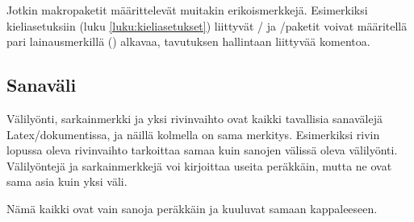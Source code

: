 
Jotkin makropaketit määrittelevät muitakin erikoismerkkejä. Esimerkiksi
kieli\-asetuksiin (luku \ref{luku:kieliasetukset}) liittyvät
\-/{} ja \-/paketit voivat
määritellä pari lainausmerkillä (\koodi{\textquotedbl}) alkavaa,
tavutuksen hallintaan liittyvää komentoa.

\subsection{Sanaväli}
\label{luku:sanavali}

Välilyönti, sarkainmerkki ja yksi rivinvaihto ovat kaikki tavallisia
sanavälejä Latex\-/dokumentissa, ja näillä kolmella on sama merkitys.
Esimerkiksi rivin lopussa oleva rivinvaihto tarkoittaa samaa kuin
sanojen välissä oleva välilyönti. Välilyöntejä ja sarkainmerkkejä voi
kirjoittaa useita peräkkäin, mutta ne ovat sama asia kuin yksi väli.

\pagebreak[3]

\begin{koodilohkosis}
  Nämä      kaikki
       ovat            vain
  sanoja  peräkkäin  ja               kuuluvat
      samaan kappaleeseen.
\end{koodilohkosis}

